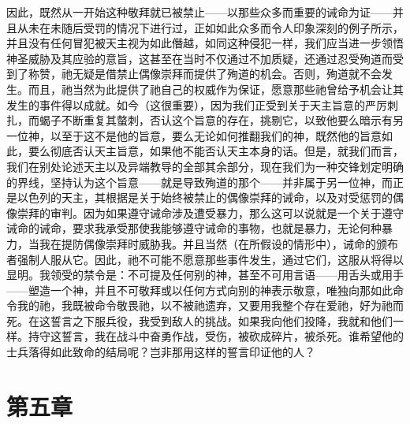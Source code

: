因此，既然从一开始这种敬拜就已被禁止——以那些众多而重要的诫命为证——并且从未在未随后受罚的情况下进行过，正如如此众多而令人印象深刻的例子所示，并且没有任何冒犯被天主视为如此僭越，如同这种侵犯一样，我们应当进一步领悟神圣威胁及其应验的意旨，这甚至在当时不仅通过不加质疑，还通过忍受殉道而受到了称赞，祂无疑是借禁止偶像崇拜而提供了殉道的机会。否则，殉道就不会发生。而且，祂当然为此提供了祂自己的权威作为保证，愿意那些祂曾给予机会让其发生的事件得以成就。如今（这很重要），因为我们正受到关于天主旨意的严厉刺扎，而蝎子不断重复其螫刺，否认这个旨意的存在，挑剔它，以致他要么暗示有另一位神，以至于这不是他的旨意，要么无论如何推翻我们的神，既然他的旨意如此，要么彻底否认天主旨意，如果他不能否认天主本身的话。但是，就我们而言，我们在别处论述天主以及异端教导的全部其余部分，现在我们为一种交锋划定明确的界线，坚持认为这个旨意——就是导致殉道的那个——并非属于另一位神，而正是以色列的天主，其根据是关于始终被禁止的偶像崇拜的诫命，以及对受惩罚的偶像崇拜的审判。因为如果遵守诫命涉及遭受暴力，那么这可以说就是一个关于遵守诫命的诫命，要求我承受那使我能够遵守诫命的事物，也就是暴力，无论何种暴力，当我在提防偶像崇拜时威胁我。并且当然（在所假设的情形中），诫命的颁布者强制人服从它。因此，祂不可能不愿意那些事件发生，通过它们，这服从将得以显明。我领受的禁令是：不可提及任何别的神，甚至不可用言语——用舌头或用手——塑造一个神，并且不可敬拜或以任何方式向别的神表示敬意，唯独向那如此命令我的祂，我既被命令敬畏祂，以不被祂遗弃，又要用我整个存在爱祂，好为祂而死。在这誓言之下服兵役，我受到敌人的挑战。如果我向他们投降，我就和他们一样。持守这誓言，我在战斗中奋勇作战，受伤，被砍成碎片，被杀死。谁希望他的士兵落得如此致命的结局呢？岂非那用这样的誓言印证他的人？\par


\section{第五章}

